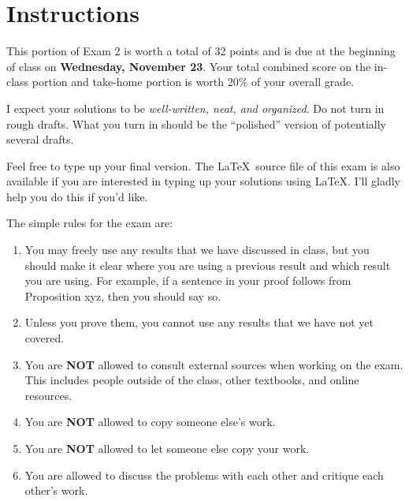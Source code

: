 \documentclass[11pt]{scrartcl}
\theoremstyle{definition}
\begin{document}
\begin{center}

  
  \bigskip
  

\end{center}

\section*{Instructions}

This portion of Exam 2 is worth a total of 32 points and is due at the beginning of class on \textbf{Wednesday, November 23}.  Your total combined score on the in-class portion and take-home portion is worth 20\% of your overall grade.  

\bigskip

I expect your solutions to be \emph{well-written, neat, and organized}.  Do not turn in rough drafts.  What you turn in should be the ``polished'' version of potentially several drafts.  
 
\bigskip

Feel free to type up your final version.  The \LaTeX\ source file of this exam is also available if you are interested in typing up your solutions using \LaTeX.  I'll gladly help you do this if you'd like.

\bigskip

The simple rules for the exam are:

\begin{enumerate}
\item You may freely use any results that we have discussed in class, but you should make it clear where you are using a previous result and which result you are using.  For example, if a sentence in your proof follows from Proposition xyz, then you should say so. 
\item Unless you prove them, you cannot use any results that we have not yet covered.
\item You are \textbf{NOT} allowed to consult external sources when working on the exam.  This includes people outside of the class, other textbooks, and online resources.
\item You are \textbf{NOT} allowed to copy someone else's work.
\item You are \textbf{NOT} allowed to let someone else copy your work.
\item You are allowed to discuss the problems with each other and critique each other's work.
\end{enumerate}
\end{document}
